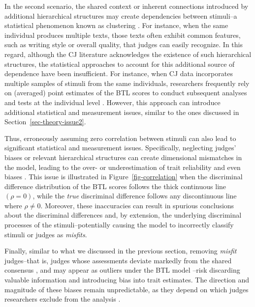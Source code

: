 \documentclass[
  authoryear,
  review,
  1p]{elsarticle}
\begin{document}
In the second scenario, the shared context or inherent connections
introduced by additional hierarchical structures may create dependencies
between stimuli--a statistical phenomenon known as clustering
\citep{Everitt_et_al_2010}. For instance, when the same individual
produces multiple texts, those texts often exhibit common features, such
as writing style or overall quality, that judges can easily recognize.
In this regard, although the CJ literature acknowledges the existence of
such hierarchical structures, the statistical approaches to account for
this additional source of dependence have been insufficient. For
instance, when CJ data incorporates multiple samples of stimuli from the
same individuals, researchers frequently rely on (averaged) point
estimates of the BTL scores to conduct subsequent analyses and tests at
the individual level
\citep{Bramley_et_al_2019, Boonen_et_al_2020, Bouwer_et_al_2023, vanDaal_et_al_2017, Jones_et_al_2019, Gijsen_et_al_2021}.
However, this approach can introduce additional statistical and
measurement issues, similar to the ones discussed in
Section~\ref{sec-theory-issue2}.

Thus, erroneously assuming zero correlation between stimuli can also
lead to significant statistical and measurement issues. Specifically,
neglecting judges' biases or relevant hierarchical structures can create
dimensional mismatches in the model, leading to the over- or
underestimation of trait reliability
\citep{Ackerman_1989, Hoyle_et_al_2023} and even biases
\citep{Wu_et_al_2022}. This issue is illustrated in
Figure~\ref{fig-correlation} when the discriminal difference
distribution of the BTL scores follows the thick continuous line
\((\rho = 0)\), while the \emph{true} discriminal difference follows any
discontinuous line where \(\rho \neq 0\). Moreover, these inaccuracies
can result in spurious conclusions about the discriminal differences
\citep{McElreath_2020} and, by extension, the underlying discriminal
processes of the stimuli--potentially causing the model to incorrectly
classify stimuli or judges as \emph{misfits}.

Finally, similar to what we discussed in the previous section, removing
\emph{misfit} judges--that is, judges whose assessments deviate markedly
from the shared consensus
\citep{Pollitt_2012a, Pollitt_2012b, vanDaal_et_al_2016, Goossens_et_al_2018, Wu_et_al_2022},
and may appear as outliers under the BTL model
\citep{Wu_et_al_2022}--risk discarding valuable information and
introducing bias into trait estimates. The direction and magnitude of
these biases remain unpredictable, as they depend on which judges
researchers exclude from the analysis
\citep{Zimmerman_1994, OHagan_2018, McElreath_2020}.
\end{document}
